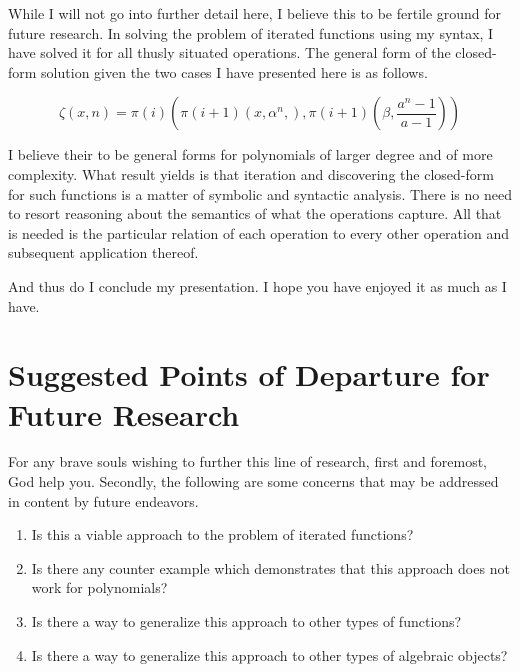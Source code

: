 While I will not go into further detail here, I believe this to be fertile
ground for future research. In solving the problem of iterated functions using
my syntax, I have solved it for all thusly situated operations. The general
form of the closed-form solution given the two cases I have presented here is
as follows.

\begin{equation}
    \zeta(x,n) = \pi(i)(\pi(i+1)(x, \alpha^n,), \pi(i+1)(\beta, \frac{a^n-1}{a-1}))
\end{equation}

I believe their to be general forms for polynomials of larger degree and of
more complexity. What result yields is that iteration and discovering the
closed-form for such functions is a matter of symbolic and syntactic analysis.
There is no need to resort reasoning about the semantics of what the operations
capture. All that is needed is the particular relation of each operation to
every other operation and subsequent application thereof.

And thus do I conclude my presentation. I hope you have enjoyed it as much as I
have.

\section{Suggested Points of Departure for Future Research}
For any brave souls wishing to further this line of research, first and
foremost, God help you. Secondly, the following are some concerns that may be
addressed in content by future endeavors.

\begin{enumerate}
    \item Is this a viable approach to the problem of iterated functions?
    \item Is there any counter example which demonstrates that this approach does not
          work for polynomials?
    \item Is there a way to generalize this approach to other types of functions?
    \item Is there a way to generalize this approach to other types of algebraic objects?
\end{enumerate}